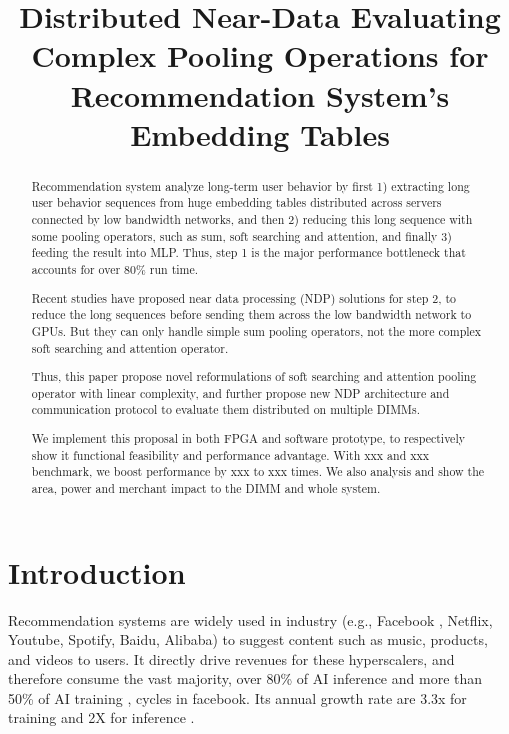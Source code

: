 \documentclass[conference]{IEEEtran}
\title{Distributed Near-Data Evaluating Complex Pooling Operations for Recommendation System's Embedding Tables}
\author{}
\begin{document}
\maketitle
\thispagestyle{firstpage}
\pagestyle{plain}




\begin{abstract}

Recommendation system analyze long-term user behavior by 
first 1) extracting long user behavior sequences from huge embedding tables
distributed across servers connected by low bandwidth networks,
and then 2) reducing this long sequence with some pooling operators,
such as sum, soft searching and attention,
and finally 3) feeding the result into MLP.
Thus,
step 1 is the major performance bottleneck that accounts for over 80\% run time.

Recent studies have proposed near data processing (NDP) 
solutions for step 2, 
to reduce the long sequences before sending them across the low bandwidth network to GPUs.
But they can only handle simple sum pooling operators,
not the more complex soft searching and attention operator.

Thus,
this paper propose novel reformulations of soft searching 
and attention pooling operator with linear complexity,
and further propose new NDP architecture and communication protocol 
to evaluate them distributed on multiple DIMMs.

We implement this proposal in both FPGA and software prototype,
to respectively show it functional feasibility and performance advantage.
With xxx and xxx  benchmark,
we boost performance by xxx to xxx times.
We also analysis and show the area, power and merchant impact to the DIMM and whole system.
\end{abstract}

\section{Introduction}

Recommendation systems are widely used in
industry (e.g., 
Facebook \cite{recsys_dlrm_facebook}, 
Netflix\cite{recsys_netflix}, 
Youtube\cite{recsys_youtube}, 
Spotify\cite{recsys_spotify}, 
Baidu\cite{recsys_mobius_baidu},
Alibaba\cite{recsys_sim_alibaba}) 
to suggest content such as music, products, and videos to users. 
It directly drive revenues for these hyperscalers,
and therefore consume the vast majority,
over 80\% of AI inference \cite{ recsys_archimp_facebook_hpca20 } and more than 50\% of AI training \cite{ recsys_trainfb_facebook } ,
cycles in facebook.
Its annual growth rate are 3.3x for training \cite{recsys_trainfb_facebook} and 2X for inference \cite{recsys_inffb_facebook}.
\end{document}
